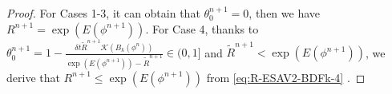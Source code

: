 \documentclass[final,review,onefignum,onetabnum]{siamart190516}
\theoremstyle{plain}
\newtheorem{remark}{\textbf{Remark}}[section]
\begin{document}
\begin{proof}
For Cases 1-3,  it can obtain that $\theta_0^{n+1}=0$, then we have $R^{n+1}= \exp\left(E(\phi^{n+1})\right)$. 
For Case 4, thanks to 
$\theta_{0}^{n+1}=1-\frac{\delta t \tilde{R}^{n+1} \mathcal{K}\left( B_{k}(\phi^{n})\right)}{\exp\left(E(\phi^{n+1})\right)-\tilde{R}^{n+1}}\in (0,1]$ and $\tilde R^{n+1}<  \exp\left(E(\phi^{n+1})\right)$, we derive that $R^{n+1}\le \exp\left(E(\phi^{n+1})\right)$ from \eqref{eq:R-ESAV2-BDFk-4} .
\end{proof}

 
 
\end{document}
